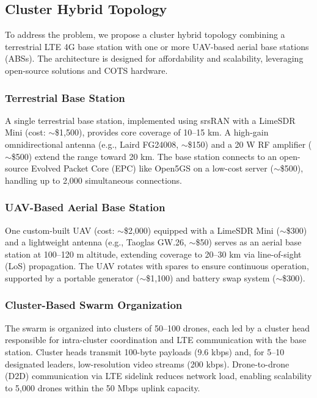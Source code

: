 \documentclass{article}
\begin{document}
\subsection{Cluster Hybrid Topology}
To address the problem, we propose a cluster hybrid topology combining a terrestrial LTE 4G base station with one or more UAV-based aerial base stations (ABSs). The architecture is designed for affordability and scalability, leveraging open-source solutions and COTS hardware.

\subsubsection{Terrestrial Base Station}
A single terrestrial base station, implemented using srsRAN with a LimeSDR Mini (cost: $\sim$\$1,500), provides core coverage of 10--15 km. A high-gain omnidirectional antenna (e.g., Laird FG24008, $\sim$\$150) and a 20 W RF amplifier ($\sim$\$500) extend the range toward 20 km. The base station connects to an open-source Evolved Packet Core (EPC) like Open5GS on a low-cost server ($\sim$\$500), handling up to 2,000 simultaneous connections.

\subsubsection{UAV-Based Aerial Base Station}
One custom-built UAV (cost: $\sim$\$2,000) equipped with a LimeSDR Mini ($\sim$\$300) and a lightweight antenna (e.g., Taoglas GW.26, $\sim$\$50) serves as an aerial base station at 100--120 m altitude, extending coverage to 20--30 km via line-of-sight (LoS) propagation. The UAV rotates with spares to ensure continuous operation, supported by a portable generator ($\sim$\$1,100) and battery swap system ($\sim$\$300).

\subsubsection{Cluster-Based Swarm Organization}
The swarm is organized into clusters of 50--100 drones, each led by a cluster head responsible for intra-cluster coordination and LTE communication with the base station. Cluster heads transmit 100-byte payloads (9.6 kbps) and, for 5--10 designated leaders, low-resolution video streams (200 kbps). Drone-to-drone (D2D) communication via LTE sidelink reduces network load, enabling scalability to 5,000 drones within the 50 Mbps uplink capacity.
\end{document}
